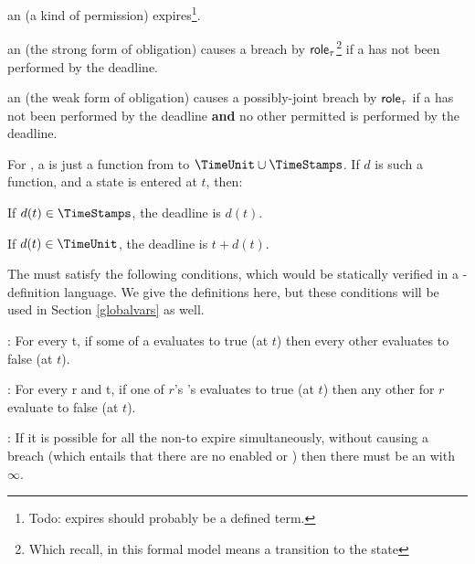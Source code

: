 \documentclass[12pt]{article}
\begin{document}
\begin{LPPI}
	\item an \enabled \mayntran (a kind of permission) expires\footnote{Todo: expires should probably be a defined term.}.
	\item an \enabled \mustntran (the strong form of obligation) causes a breach by $\textsf{role}_{\tau}$\footnote{Which recall, in this formal model means a transition to the state \breached{\{\role{\tau}\}}} if a \compatible \Event has not been performed by the deadline. 
	\item an \enabled \rmustntran (the weak form of obligation) causes a possibly-joint breach by $\textsf{role}_{\tau}$ if a \compatible \Event has not been performed by the deadline {\bf and} no other permitted \Event is performed by the deadline. 
	\end{LPPI}
For \FSContracts, a \DeadlineFn is just a function from \TimeStamps to $\TimeUnit \cup \TimeStamps$. If $d$ is such a function, and a state is entered at \TimeStamp $t$, then:
\begin{LPPI}
\item If $d(t) \in \TimeStamps$, the deadline is $d(t)$.
	\item If $d(t) \in \TimeUnit$, the deadline is $t + d(t)$.
\end{LPPI}

The \TGuards must satisfy the following conditions, which would be statically verified in a \Contract-definition language. We give the \FSContracts definitions here, but these conditions will be used in Section \ref{globalvars} as well.
\medskip

\noindent {}: For every \TimeStamp t, if some \TGuard of a \mustntran evaluates to true (at $t$) then every other \TGuard evaluates to false (at $t$). 
\medskip

\noindent {}: For every \Role r and \TimeStamp t, if one of $r$'s \rmustntrans's \TGuards evaluates to true (at $t$) then any other \rmustntrans for $r$ evaluate to false (at $t$).
\medskip

\noindent {}: If it is possible for all the \enabled non-\Env \transitions to expire simultaneously, without causing a breach (which entails that there are no enabled \mustntrans or \rmustntrans) then there must be an \depTrans{\Env} with \Deadline $\infty$.
\smallskip



%
\end{document}
